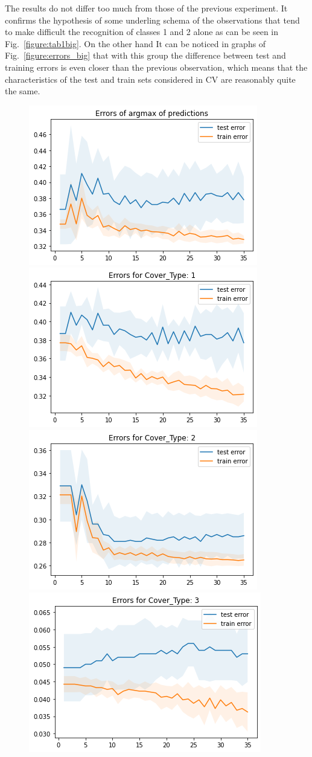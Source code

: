 \documentclass{scrartcl}
\begin{document}
The results do not differ too much from those of the previous experiment. It confirms the hypothesis of some underling schema of the observations that tend to make difficult the recognition of classes 1 and 2 alone as can be seen in Fig.~\ref{figure:tab1big}. On the other hand It can be noticed in graphs of Fig.~\ref{figure:errors_big} that with this group the difference between test and training errors is even closer than the previous observation, which means that the characteristics of the test and train sets considered in CV are reasonably quite the same.

\begin{figure}
\centering
{\includegraphics[width=.45\textwidth]{imgs/N1000_T35/full_plot_1000.png}} \quad
{\includegraphics[width=.45\textwidth]{imgs/N1000_T35/cv_1_1000.png}} \\
{\includegraphics[width=.45\textwidth]{imgs/N1000_T35/cv_2_1000.png}} \quad
{\includegraphics[width=.45\textwidth]{imgs/N1000_T35/cv_3_1000.png}} \\

\end{figure}
\end{document}
